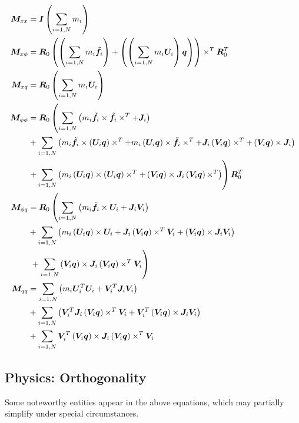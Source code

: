 \begin{subequations}
\begin{align}
	\bm{M}_{xx}	&= \bm{I} \left( \sum_{i=1,N} m_i \right) \\
	\bm{M}_{x\phi}	&= \bm{R}_0 \left( \left( 
		\sum_{i=1,N} m_i \tilde{\bm{f}}_i
	 \right) + \left( \left( 
		\sum_{i=1,N} m_i \bm{U}_i
	 \right) \bm{q} \right) \right) \times^T \bm{R}_0^T \\
	\bm{M}_{xq}	&= \bm{R}_0 \left( \sum_{i=1,N} m_i \bm{U}_i \right) \\
	\bm{M}_{\phi\phi}&= \bm{R}_0 \left( 
		\sum_{i=1,N} \left( 
			m_i \tilde{\bm{f}}_i \times \tilde{\bm{f}}_i\times^T
			+ \bm{J}_i
		 \right)
	 \right. \nonumber \\
			& \mbox{} + \sum_{i=1,N} \left( 
			m_i \tilde{\bm{f}}_i \times \left( \bm{U}_i \bm{q} \right)\times^T
			+ m_i \left( \bm{U}_i \bm{q} \right)\times \tilde{\bm{f}}_i \times^T
			+ \bm{J}_i \left( \bm{V}_i \bm{q} \right)\times^T
			+ \left( \bm{V}_i \bm{q} \right)\times \bm{J}_i
	 \right) \nonumber \\
			& \left.  \mbox + \sum_{i=1,N} \left( 
			m_i \left( \bm{U}_i \bm{q} \right)\times \left( \bm{U}_i \bm{q} \right)\times^T
			+ \left( \bm{V}_i \bm{q} \right)\times \bm{J}_i \left( \bm{V}_i \bm{q} \right)\times^T
	 \right) \right) \bm{R}_0^T \\
	\bm{M}_{\phi q}	&= \bm{R}_0 \left( 
		\sum_{i=1,N} \left( 
			m_i \tilde{\bm{f}}_i \times \bm{U}_i
			+ \bm{J}_i \bm{V}_i
		 \right)
	 \right. \nonumber \\
			& \mbox{} + \sum_{i=1,N} \left( 
			m_i \left( \bm{U}_i \bm{q} \right) \times \bm{U}_i
			+ \bm{J}_i \left( \bm{V}_i \bm{q} \right)\times^T \bm{V}_i
			+ \left( \bm{V}_i \bm{q} \right)\times \bm{J}_i \bm{V}_i
	 \right) \nonumber \\
			& \left.  \mbox{} + \sum_{i=1,N} \left( \bm{V}_i \bm{q} \right)\times \bm{J}_i \left( \bm{V}_i \bm{q} \right)\times^T \bm{V}_i
	 \right) \\
	\bm{M}_{qq}	&= \sum_{i=1,N} \left( 
		m_i \bm{U}_i^T \bm{U}_i
		+ \bm{V}_i^T \bm{J}_i \bm{V}_i
	 \right) \nonumber \\
			& \mbox{} + \sum_{i=1,N} \left( 
			\bm{V}_i^T \bm{J}_i \left( \bm{V}_i \bm{q} \right)\times^T \bm{V}_i
			+ \bm{V}_i^T \left( \bm{V}_i \bm{q} \right)\times \bm{J}_i \bm{V}_i
	 \right) \nonumber \\
			& \mbox{} + \sum_{i=1,N}
			\bm{V}_i^T \left( \bm{V}_i \bm{q} \right)\times \bm{J}_i \left( \bm{V}_i \bm{q} \right)\times^T \bm{V}_i
\end{align}
\end{subequations}

\subsection{Physics: Orthogonality}
Some noteworthy entities appear in the above equations, which may partially
simplify under special circumstances.

